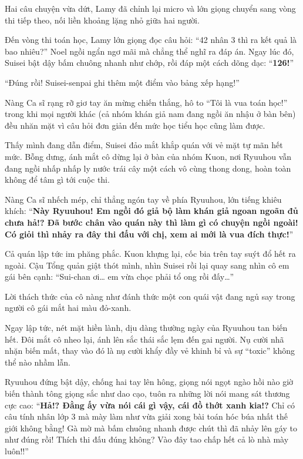\documentclass[../main.tex]{subfiles}
\begin{document}
Hai câu chuyện vừa dứt, Lamy đã chỉnh lại micro và lớn giọng chuyển sang vòng thi tiếp theo, nối liền khoảng lặng nhỏ giữa hai người.

Đến vòng thi toán học, Lamy lớn giọng đọc câu hỏi: ``42 nhân 3 thì ra kết quả là bao nhiêu?'' Noel ngồi ngẩn ngơ mãi mà chẳng thể nghĩ ra đáp án. Ngay lúc đó, Suisei bật dậy bấm chuông nhanh như chớp, rồi đáp một cách dõng dạc: ``\textbf{126!}''

``Đúng rồi! Suisei-senpai ghi thêm một điểm vào bảng xếp hạng!''

Nàng Ca sĩ rạng rỡ giơ tay ăn mừng chiến thắng, hô to ``Tôi là vua toán học!'' trong khi mọi người khác (cả nhóm khán giả nam đang ngồi ăn nhậu ở bàn bên) đều nhăn mặt vì câu hỏi đơn giản đến mức học tiểu học cũng làm được.

Thấy mình đang dẫn điểm, Suisei đảo mắt khắp quán với vẻ mặt tự mãn hết mức. Bỗng dưng, ánh mắt cô dừng lại ở bàn của nhóm Kuon, nơi Ryuuhou vẫn đang ngồi nhấp nhấp ly nước trái cây một cách vô cùng thong dong, hoàn toàn không để tâm gì tới cuộc thi.

Nàng Ca sĩ nhếch mép, chỉ thẳng ngón tay về phía Ryuuhou, lớn tiếng khiêu khích: ``\textbf{Này Ryuuhou! Em ngồi đó giả bộ làm khán giả ngoan ngoãn đủ chưa hả!? Đã bước chân vào quán này thì làm gì có chuyện ngồi ngoài! Có giỏi thì nhảy ra đây thi đấu với chị, xem ai mới là vua đích thực!}''

Cả quán lập tức im phăng phắc. Kuon khựng lại, cốc bia trên tay suýt đổ hết ra ngoài. Cậu Tổng quản giật thót mình, nhìn Suisei rồi lại quay sang nhìn cô em gái bên cạnh: ``Sui-chan ơi\dots{} em vừa chọc phải tổ ong rồi đấy\dots''

Lời thách thức của cô nàng như đánh thức một con quái vật đang ngủ say trong người cô gái mắt hai màu đỏ-xanh.

Ngay lập tức, nét mặt hiền lành, dịu dàng thường ngày của Ryuuhou tan biến hết. Đôi mắt cô nheo lại, ánh lên sắc thái sắc lẹm đến gai người. Nụ cười nhã nhặn biến mất, thay vào đó là nụ cười khẩy đầy vẻ khinh bỉ và sự ``toxic'' không thể nào nhầm lẫn.

Ryuuhou đứng bật dậy, chống hai tay lên hông, giọng nói ngọt ngào hồi nào giờ biến thành tông giọng sắc như dao cạo, tuôn ra những lời nói mang sát thương cực cao: ``\textbf{Hả!? Đằng ấy vừa nói cái gì vậy, cái đồ thớt xanh kia!?} Chỉ có câu tính nhân lớp 3 mà mày làm như vừa giải xong bài toán hóc búa nhất thế giới không bằng! Gà mờ mà bấm chuông nhanh được chút thì đã nhảy lên gáy to như đúng rồi! Thích thi đấu đúng không? Vào đây tao chấp hết cả lò nhà mày luôn!!''
\end{document}
